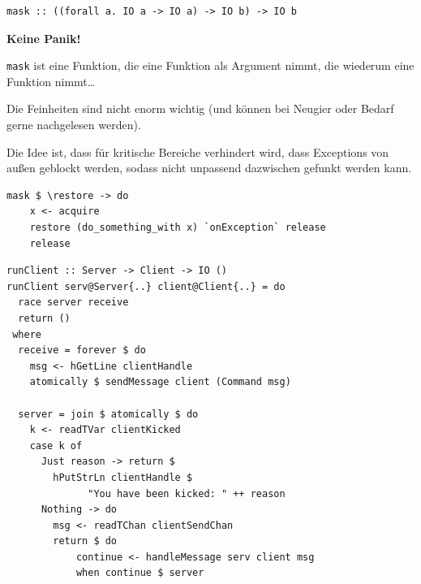 \documentclass{beamer}
\begin{document}

\begin{frame}[fragile]

\begin{verbatim}
mask :: ((forall a. IO a -> IO a) -> IO b) -> IO b 
\end{verbatim}
\pause\smallskip

\begin{center}
\textbf{Keine Panik!}
\end{center}
\pause\smallskip

\texttt{mask} ist eine Funktion, die eine Funktion als Argument nimmt, die wiederum eine Funktion nimmt\dots

Die Feinheiten sind nicht enorm wichtig (und können bei Neugier oder Bedarf gerne nachgelesen werden).

Die Idee ist, dass für kritische Bereiche verhindert wird, dass Exceptions von außen geblockt werden, sodass nicht unpassend dazwischen gefunkt werden kann.\pause\smallskip

\begin{verbatim}
mask $ \restore -> do
    x <- acquire
    restore (do_something_with x) `onException` release
    release
\end{verbatim}

\end{frame}


\begin{frame}[fragile]

\begin{verbatim}
runClient :: Server -> Client -> IO ()
runClient serv@Server{..} client@Client{..} = do
  race server receive
  return ()
 where
  receive = forever $ do
    msg <- hGetLine clientHandle
    atomically $ sendMessage client (Command msg)

  server = join $ atomically $ do
    k <- readTVar clientKicked
    case k of
      Just reason -> return $
        hPutStrLn clientHandle $
              "You have been kicked: " ++ reason
      Nothing -> do
        msg <- readTChan clientSendChan
        return $ do
            continue <- handleMessage serv client msg
            when continue $ server
\end{verbatim}

\end{frame}
\end{document}

